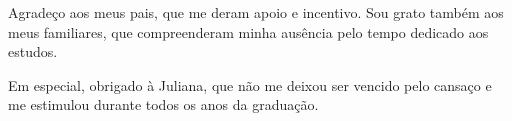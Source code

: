 \begin{agradecimentos}

Agradeço aos meus pais, que me deram apoio e incentivo. Sou grato também aos meus familiares, que compreenderam minha ausência pelo tempo dedicado aos estudos.

Em especial, obrigado à Juliana, que não me deixou ser vencido pelo cansaço e me estimulou durante todos os anos da graduação.

\end{agradecimentos}
